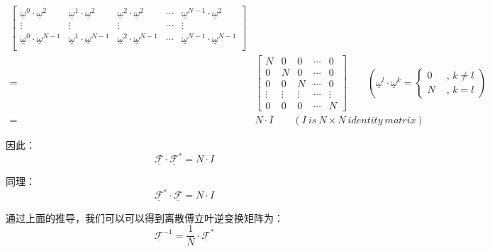 \begin{align*}
\begin{bmatrix}
		\underline{\omega}^0\cdot\underline{\omega}^2     & \underline{\omega}^1\cdot\underline{\omega}^2     & \underline{\omega}^2\cdot\underline{\omega}^2     & \cdots & \underline{\omega}^{N-1}\cdot\underline{\omega}^2     \\
		\vdots                                            & \vdots                                            & \vdots                                            & \cdots & \vdots                                                \\
		\underline{\omega}^0\cdot\underline{\omega}^{N-1} & \underline{\omega}^1\cdot\underline{\omega}^{N-1} & \underline{\omega}^2\cdot\underline{\omega}^{N-1} & \cdots & \underline{\omega}^{N-1}\cdot\underline{\omega}^{N-1} \\
	\end{bmatrix}                                                                                                   \\
	=     & \begin{bmatrix} N &0  &0  &\cdots  &0 \\  0 &N  &0  &\cdots  &0 \\  0 &0  &N  &\cdots  &0 \\  \vdots &\vdots  &\vdots  &\cdots  &\vdots \\  0 &0  &0  &\cdots  &N  \end{bmatrix}  \qquad \left( \underline{\omega}^l\cdot\underline{\omega}^k = \begin{cases} 0 & \text{ , } k\neq l \\  N & \text{ , } k= l \end{cases} \right) \\
	=     & N\cdot I \qquad (I\ is\ N\times N\ identity\ matrix)
\end{align*}

因此：
\begin{equation}
	\underline{\mathcal{F}}\cdot \underline{\mathcal{F}}^{*}=N\cdot I
\end{equation}

同理：
\begin{equation}
	\underline{\mathcal{F}}^{*}\cdot \underline{\mathcal{F}}=N\cdot I
\end{equation}

通过上面的推导，我们可以可以得到离散傅立叶逆变换矩阵为：
\begin{equation}
	\underline{\mathcal{F}}^{-1} = \frac{1}{N}\cdot \underline{\mathcal{F}}^{*}
\end{equation}

